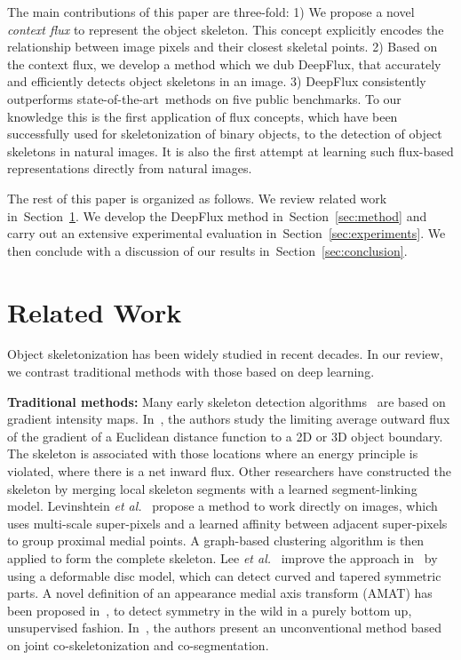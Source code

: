 \documentclass[10pt,twocolumn,letterpaper]{article}
\def\sota{state-of-the-art}
\newcommand{\refsec}[1]{Section~\ref{#1}}
\begin{document}
The main contributions of this paper are three-fold:
1) We propose a novel \emph{context flux} to represent the object skeleton. This concept explicitly encodes the relationship between image pixels and their closest skeletal points.
2) Based on the context flux, we develop a method which we dub DeepFlux, that accurately and efficiently detects object skeletons in an image.
3) DeepFlux consistently outperforms \sota\ methods on five public benchmarks. To our knowledge this is the first application of flux concepts, which have been successfully used for skeletonization of binary objects, to the detection of object skeletons in natural images. It is also the first attempt at learning such flux-based representations directly from natural images.

The rest of this paper is organized as follows. We review related work in~\refsec{sec:related}. We develop the DeepFlux method in~\refsec{sec:method} and carry out an extensive experimental evaluation in~\refsec{sec:experiments}. We then conclude with a discussion of our results in~\refsec{sec:conclusion}.

\section{Related Work} \label{sec:related}

Object skeletonization has been widely studied in recent decades. In our review, we contrast traditional methods with those based on deep learning.
\medskip

\noindent\textbf{Traditional methods:}
Many early skeleton detection algorithms~\cite{lindeberg1998edge,liu1998segmenting,jang2001pseudo,yu2004segmentation,nedzved2006gray,zhang2007accurate,lindeberg2013scale} are based on gradient intensity maps. In~\cite{siddiqi2002hamilton}, the authors study the limiting average outward flux of the gradient of a Euclidean distance function to a 2D or 3D object boundary. The skeleton is associated with those locations where an energy principle is violated, where there is a net inward flux. Other researchers have constructed the skeleton by merging local skeleton segments with a learned segment-linking model. Levinshtein {\em et al.}~\cite{levinshtein2013multiscale} propose a method to work directly on images, which uses multi-scale super-pixels and a learned affinity between adjacent super-pixels to group proximal medial points. A graph-based clustering algorithm is then applied to form the complete skeleton. Lee {\em et al.}~\cite{sie2013detecting} improve the approach in~\cite{levinshtein2013multiscale} by using a deformable disc model, which can detect curved and tapered symmetric parts. A novel definition of an appearance medial axis transform (AMAT) has been proposed in~\cite{tsogkas2017amat}, to detect symmetry in the wild in a purely bottom up, unsupervised fashion. In~\cite{jerripothula2017object}, the authors present an unconventional method based on joint co-skeletonization and co-segmentation.
\end{document}
